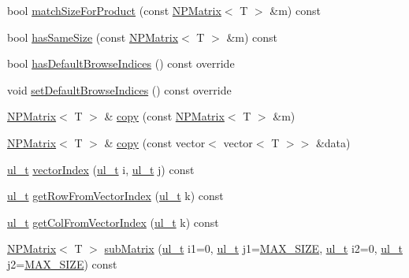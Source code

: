 \begin{DoxyCompactItemize}
\item 
bool \mbox{\hyperlink{class_n_p_matrix_a568a5ab1b6f0d51b3045dc8a81666209}{match\+Size\+For\+Product}} (const \mbox{\hyperlink{class_n_p_matrix}{N\+P\+Matrix}}$<$ T $>$ \&m) const
\item 
bool \mbox{\hyperlink{class_n_p_matrix_a8293f07a744e03121a57176c97bf452b}{has\+Same\+Size}} (const \mbox{\hyperlink{class_n_p_matrix}{N\+P\+Matrix}}$<$ T $>$ \&m) const
\item 
bool \mbox{\hyperlink{class_n_p_matrix_a500e7eb470961e8c855ab52264a2c3be}{has\+Default\+Browse\+Indices}} () const override
\item 
void \mbox{\hyperlink{class_n_p_matrix_a58e138e518c03a4f9751fafdf7e43bcb}{set\+Default\+Browse\+Indices}} () const override
\item 
\mbox{\hyperlink{class_n_p_matrix}{N\+P\+Matrix}}$<$ T $>$ \& \mbox{\hyperlink{class_n_p_matrix_ad2420de13cf39828daf36fd74aea9d2d}{copy}} (const \mbox{\hyperlink{class_n_p_matrix}{N\+P\+Matrix}}$<$ T $>$ \&m)
\item 
\mbox{\hyperlink{class_n_p_matrix}{N\+P\+Matrix}}$<$ T $>$ \& \mbox{\hyperlink{class_n_p_matrix_aea56ed6b8852d53ddedce7d9f0ea5a08}{copy}} (const vector$<$ vector$<$ T $>$$>$ \&data)
\item 
\mbox{\hyperlink{group___n_algebra_ga1b140a2034db3f5dfe18a987745df43a}{ul\+\_\+t}} \mbox{\hyperlink{class_n_p_matrix_a1edc980b44c5b898ba3feb7d4f5ab625}{vector\+Index}} (\mbox{\hyperlink{group___n_algebra_ga1b140a2034db3f5dfe18a987745df43a}{ul\+\_\+t}} i, \mbox{\hyperlink{group___n_algebra_ga1b140a2034db3f5dfe18a987745df43a}{ul\+\_\+t}} j) const
\item 
\mbox{\hyperlink{group___n_algebra_ga1b140a2034db3f5dfe18a987745df43a}{ul\+\_\+t}} \mbox{\hyperlink{class_n_p_matrix_aa8f30ca3523d088186e8320f9e21b772}{get\+Row\+From\+Vector\+Index}} (\mbox{\hyperlink{group___n_algebra_ga1b140a2034db3f5dfe18a987745df43a}{ul\+\_\+t}} k) const
\item 
\mbox{\hyperlink{group___n_algebra_ga1b140a2034db3f5dfe18a987745df43a}{ul\+\_\+t}} \mbox{\hyperlink{class_n_p_matrix_a3ef7e9e257ba6119e369a9a3c633d35d}{get\+Col\+From\+Vector\+Index}} (\mbox{\hyperlink{group___n_algebra_ga1b140a2034db3f5dfe18a987745df43a}{ul\+\_\+t}} k) const
\item 
\mbox{\hyperlink{class_n_p_matrix}{N\+P\+Matrix}}$<$ T $>$ \mbox{\hyperlink{class_n_p_matrix_a1af1b395e03d5009666214eb7f954afb}{sub\+Matrix}} (\mbox{\hyperlink{group___n_algebra_ga1b140a2034db3f5dfe18a987745df43a}{ul\+\_\+t}} i1=0, \mbox{\hyperlink{group___n_algebra_ga1b140a2034db3f5dfe18a987745df43a}{ul\+\_\+t}} j1=\mbox{\hyperlink{_n_vector_8h_a0592dba56693fad79136250c11e5a7fe}{M\+A\+X\+\_\+\+S\+I\+ZE}}, \mbox{\hyperlink{group___n_algebra_ga1b140a2034db3f5dfe18a987745df43a}{ul\+\_\+t}} i2=0, \mbox{\hyperlink{group___n_algebra_ga1b140a2034db3f5dfe18a987745df43a}{ul\+\_\+t}} j2=\mbox{\hyperlink{_n_vector_8h_a0592dba56693fad79136250c11e5a7fe}{M\+A\+X\+\_\+\+S\+I\+ZE}}) const
$$
\end{DoxyCompactItemize}
